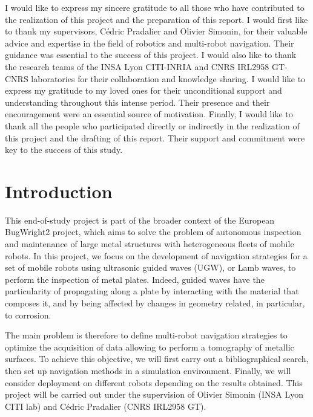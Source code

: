 \documentclass[english,RandD]{rapportPFE}  %
\begin{document}
	\begin{remerciements}
		I would like to express my sincere gratitude to all those who have contributed to the realization of this project and the preparation of this report.
		I would first like to thank my supervisors, Cédric Pradalier and Olivier Simonin, for their valuable advice and expertise in the field of robotics and multi-robot navigation.
		Their guidance was essential to the success of this project.
		I would also like to thank the research teams of the INSA Lyon CITI-INRIA and CNRS IRL2958 GT-CNRS laboratories for their collaboration and knowledge sharing.
		I would like to express my gratitude to my loved ones for their unconditional support and understanding throughout this intense period.
		Their presence and their encouragement were an essential source of motivation.
		Finally, I would like to thank all the people who participated directly or indirectly in the realization of this project and the drafting of this report.
		Their support and commitment were key to the success of this study.
	\end{remerciements}
	\setcounter{tocdepth}{3}
	\tableofcontents
	\cleardoublepage
	\section{Introduction}
		This end-of-study project is part of the broader context of the European BugWright2 project, which aims to solve the problem of autonomous inspection and maintenance of large metal structures with heterogeneous fleets of mobile robots.
		In this project, we focus on the development of navigation strategies for a set of mobile robots using ultrasonic guided waves (UGW), or Lamb waves, to perform the inspection of metal plates.
		Indeed, guided waves have the particularity of propagating along a plate by interacting with the material that composes it, and by being affected by changes in geometry related, in particular, to corrosion.

		The main problem is therefore to define multi-robot navigation strategies to optimize the acquisition of data allowing to perform a tomography of metallic surfaces.
		To achieve this objective, we will first carry out a bibliographical search, then set up navigation methods in a simulation environment.
		Finally, we will consider deployment on different robots depending on the results obtained.
		This project will be carried out under the supervision of Olivier Simonin (INSA Lyon CITI lab) and Cédric Pradalier (CNRS IRL2958 GT).
\end{document}
